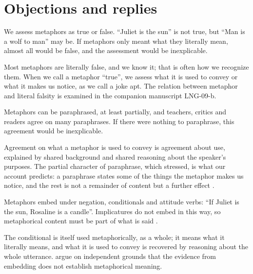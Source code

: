 \documentclass{situationist-preprint}
\begin{document}
\section{Objections and replies}

\begin{objection}\label{o:truth}
We assess metaphors as true or false. \enquote{Juliet is the sun} is not true, but \enquote{Man is a wolf to man} may be. If metaphors only meant what they literally mean, almost all would be false, and the assessment would be inexplicable.
\end{objection}

\begin{reply}
Most metaphors are literally false, and we know it; that is often how we recognize them. When we call a metaphor \enquote{true}, we assess what it is used to convey or what it makes us notice, as we call a joke apt. The relation between metaphor and literal falsity is examined in the companion manuscript LNG-09-b.
\end{reply}

\begin{objection}[Paraphrase]\label{o:para}
Metaphors can be paraphrased, at least partially, and teachers, critics and readers agree on many paraphrases. If there were nothing to paraphrase, this agreement would be inexplicable.
\end{objection}

\begin{reply}
Agreement on what a metaphor is used to convey is agreement about use, explained by shared background and shared reasoning about the speaker's purposes. The partial character of paraphrase, which \citet{Black1954} stressed, is what our account predicts: a paraphrase states some of the things the metaphor makes us notice, and the rest is not a remainder of content but a further effect \citep{Camp2006}.
\end{reply}

\begin{objection}[Embedding]\label{o:embed}
Metaphors embed under negation, conditionals and attitude verbs: \enquote{If Juliet is the sun, Rosaline is a candle}. Implicatures do not embed in this way, so metaphorical content must be part of what is said \citep{Stern2000}.
\end{objection}

\begin{reply}
The conditional is itself used metaphorically, as a whole; it means what it literally means, and what it is used to convey is recovered by reasoning about the whole utterance. \citet{LeporeStone2010} argue on independent grounds that the evidence from embedding does not establish metaphorical meaning.
\end{reply}
\end{document}
